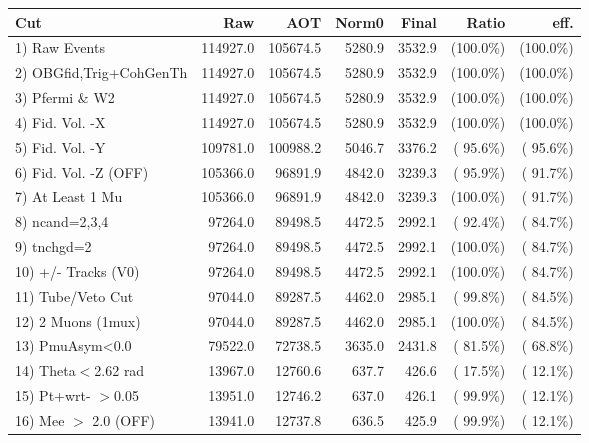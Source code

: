  \begin{table}[h!]\centering
 \begin{tabular}{||l||r|r|r|r|r|r||}
 \hline
 \hline
 Cut & Raw & AOT & Norm0 & Final & Ratio & eff.       \\
 \hline
  1) Raw Events           &     114927.0 &     105674.5 &       5280.9 &       3532.9 & (100.0\%) & (100.0\%) \\
  2) OBGfid,Trig+CohGenTh &     114927.0 &     105674.5 &       5280.9 &       3532.9 & (100.0\%) & (100.0\%) \\
  3) Pfermi \& W2         &     114927.0 &     105674.5 &       5280.9 &       3532.9 & (100.0\%) & (100.0\%) \\
  4) Fid. Vol. -X         &     114927.0 &     105674.5 &       5280.9 &       3532.9 & (100.0\%) & (100.0\%) \\
  5) Fid. Vol. -Y         &     109781.0 &     100988.2 &       5046.7 &       3376.2 & ( 95.6\%) & ( 95.6\%) \\
  6) Fid. Vol. -Z (OFF)   &     105366.0 &      96891.9 &       4842.0 &       3239.3 & ( 95.9\%) & ( 91.7\%) \\
  7) At Least 1 Mu        &     105366.0 &      96891.9 &       4842.0 &       3239.3 & (100.0\%) & ( 91.7\%) \\
  8) ncand=2,3,4          &      97264.0 &      89498.5 &       4472.5 &       2992.1 & ( 92.4\%) & ( 84.7\%) \\
  9) tnchgd=2             &      97264.0 &      89498.5 &       4472.5 &       2992.1 & (100.0\%) & ( 84.7\%) \\
 10) +/- Tracks (V0)      &      97264.0 &      89498.5 &       4472.5 &       2992.1 & (100.0\%) & ( 84.7\%) \\
 11) Tube/Veto Cut        &      97044.0 &      89287.5 &       4462.0 &       2985.1 & ( 99.8\%) & ( 84.5\%) \\
 12) 2 Muons (1mux)       &      97044.0 &      89287.5 &       4462.0 &       2985.1 & (100.0\%) & ( 84.5\%) \\
 13) PmuAsym<0.0          &      79522.0 &      72738.5 &       3635.0 &       2431.8 & ( 81.5\%) & ( 68.8\%) \\
 14) Theta$<$2.62 rad     &      13967.0 &      12760.6 &        637.7 &        426.6 & ( 17.5\%) & ( 12.1\%) \\
 15) Pt+wrt- $>$0.05      &      13951.0 &      12746.2 &        637.0 &        426.1 & ( 99.9\%) & ( 12.1\%) \\
 16) Mee $>$ 2.0  (OFF)   &      13941.0 &      12737.8 &        636.5 &        425.9 & ( 99.9\%) & ( 12.1\%) \\

\end{tabular}
\end{table}
